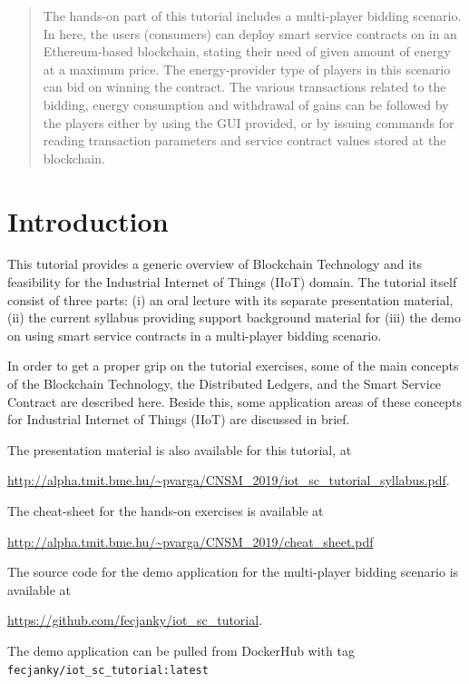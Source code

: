 \documentclass[a4paper]{article}
\begin{document}
\begin{abstract}
The hands-on part of this tutorial includes a multi-player bidding scenario.  In here, the users (consumers) can deploy smart service contracts on in an Ethereum-based blockchain, stating their need of given amount of energy at a maximum price. The energy-provider type of players in this scenario can bid on winning the contract. The various transactions related to the bidding, energy consumption and withdrawal of gains can be followed by the players either by using the GUI provided, or by issuing commands for reading transaction parameters and service contract values stored at the blockchain.

\end{abstract}

\newpage

\tableofcontents


\section{Introduction}

This tutorial provides a generic overview of Blockchain Technology and its feasibility for the  Industrial Internet of Things (IIoT) domain. The tutorial itself consist of three parts: (i) an oral lecture with its separate presentation material, (ii) the current syllabus providing support background material for (iii) the demo on using smart service contracts in a multi-player bidding scenario.

In order to get a proper grip on the tutorial exercises, some of the main concepts of the Blockchain Technology, the Distributed Ledgers, and the Smart Service Contract are described here.
Beside this, some application areas of these concepts for Industrial Internet of Things (IIoT) are discussed in brief.

The presentation material is also available for this tutorial, at

\url{http://alpha.tmit.bme.hu/~pvarga/CNSM_2019/iot_sc_tutorial_syllabus.pdf}.

The cheat-sheet for the hands-on exercises is available at

\url{http://alpha.tmit.bme.hu/~pvarga/CNSM_2019/cheat_sheet.pdf}

The source code for the demo application for the multi-player bidding scenario is available at

\url{https://github.com/fecjanky/iot_sc_tutorial}.

The demo application can be pulled from DockerHub with tag \verb!fecjanky/iot_sc_tutorial:latest!
\end{document}
